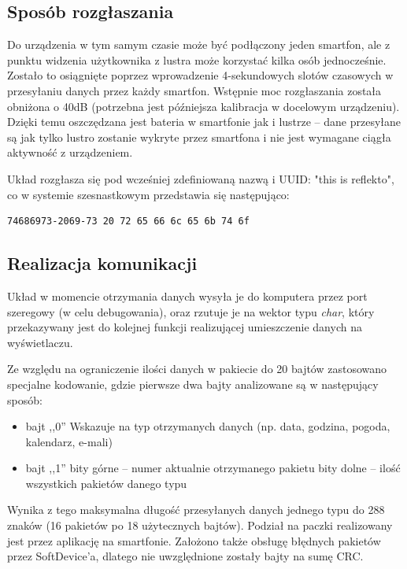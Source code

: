 \documentclass[a4paper,11pt]{article}
\begin{document}
\subsection{Sposób rozgłaszania}
Do urządzenia w tym samym czasie może być podłączony jeden smartfon, ale z punktu widzenia użytkownika z lustra może korzystać kilka osób jednocześnie. Zostało to osiągnięte poprzez wprowadzenie 4-sekundowych slotów czasowych w przesyłaniu danych przez każdy smartfon. Wstępnie moc rozgłaszania została obniżona o 40dB (potrzebna jest późniejsza kalibracja w docelowym urządzeniu). Dzięki temu oszczędzana jest bateria w smartfonie jak i lustrze -- dane przesyłane są jak tylko lustro zostanie wykryte przez smartfona i nie jest wymagane ciągła aktywność z urządzeniem.

Układ rozgłasza się pod wcześniej zdefiniowaną nazwą i UUID: "this is reflekto", co w systemie szesnastkowym przedstawia się następująco:
\begin{lstlisting}
74686973-2069-73 20 72 65 66 6c 65 6b 74 6f
\end{lstlisting}

\subsection{Realizacja komunikacji}
Układ w momencie otrzymania danych wysyła je do komputera przez port szeregowy (w celu debugowania), oraz rzutuje je na wektor typu \textit{char}, który przekazywany jest do kolejnej funkcji realizującej umieszczenie danych na wyświetlaczu.

Ze względu na ograniczenie ilości danych w pakiecie do 20 bajtów zastosowano specjalne kodowanie, gdzie pierwsze dwa bajty analizowane są w następujący sposób: 
\begin{itemize}
	\item bajt ,,0''
	\subitem Wskazuje na typ otrzymanych danych (np. data, godzina, pogoda, kalendarz, e-mali) 
	\item bajt ,,1''
	 bity górne -- numer aktualnie otrzymanego pakietu
	 bity dolne -- ilość wszystkich pakietów danego typu
\end{itemize}
Wynika z tego maksymalna długość przesyłanych danych jednego typu do 288 znaków (16 pakietów po 18 użytecznych bajtów). Podział na paczki realizowany jest przez aplikację na smartfonie. Założono także obsługę błędnych pakietów przez SoftDevice'a, dlatego nie uwzględnione zostały bajty na sumę CRC.
\end{document}
